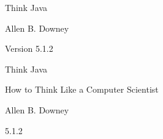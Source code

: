 \documentclass[12pt]{book}
\title{\thetitle}
\author{Allen B. Downey}
\newcommand{\theversion}{5.1.2}
\theoremstyle{exercise}
\begin{document}
\frontmatter


\begin{htmlonly}


{\Large Think Java}

{\large Allen B. Downey}

Version \theversion

\setcounter{chapter}{-1}

\end{htmlonly}




\begin{latexonly}


%
%
%
%
%
%



\pagebreak
\thispagestyle{empty}

\begin{flushright}
\vspace*{2.5in}

{\huge Think Java}

\vspace{0.25in}

{\LARGE How to Think Like a Computer Scientist}

\vspace{1in}

{\Large
Allen B. Downey
}


\vspace{1in}

{\Large \theversion}

\vfill

\end{flushright}


\pagebreak
\thispagestyle{empty}


\end{latexonly}
\end{document}
